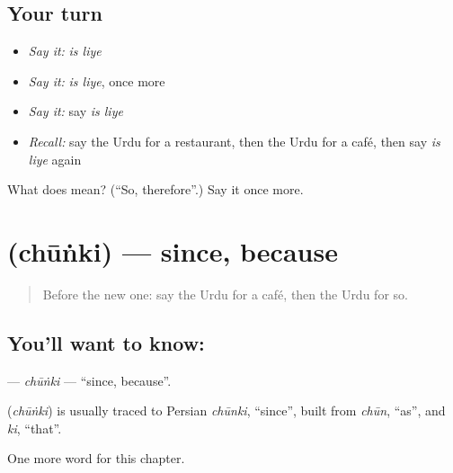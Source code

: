 \subsection*{Your turn}
\begin{itemize}
\raggedright
  \item \emph{Say it:} \emph{is liye}
  \item \emph{Say it:} \emph{is liye}, once more
  \item \emph{Say it:} say \emph{is liye}
  \item \emph{Recall:} say the Urdu for a restaurant, then the Urdu for a café, then say \emph{is liye} again
\end{itemize}

\begin{tcolorbox}[breakable,colback=teal!4,colframe=teal!35!black,title={Before you move on}]
What does   mean? (\textquotedblleft{}So, therefore\textquotedblright{}.) Say it once more.
\end{tcolorbox}
\section[\texorpdfstring{\ur{چونکہ} (chūṅki)}{چونکہ (chūṅki)}]{ (chūṅki) — since, because}

\label{lesson:UR-C159-chunki}



\begin{quote}
Before the new one: say the Urdu for a café, then the Urdu for so.
\end{quote}

\subsection*{You'll want to know: }
\textbf{} — \emph{chūṅki} — \textquotedblleft{}since, because\textquotedblright{}.

\begin{cousinweb}
\textbf{} (\emph{chūṅki}) is usually traced to Persian \emph{chūnki}, \textquotedblleft{}since\textquotedblright{}, built from \emph{chūn}, \textquotedblleft{}as\textquotedblright{}, and \emph{ki}, \textquotedblleft{}that\textquotedblright{}.
\end{cousinweb}

\begin{grammarlens}[title={What you've built}]
One more word for this chapter.
\end{grammarlens}

